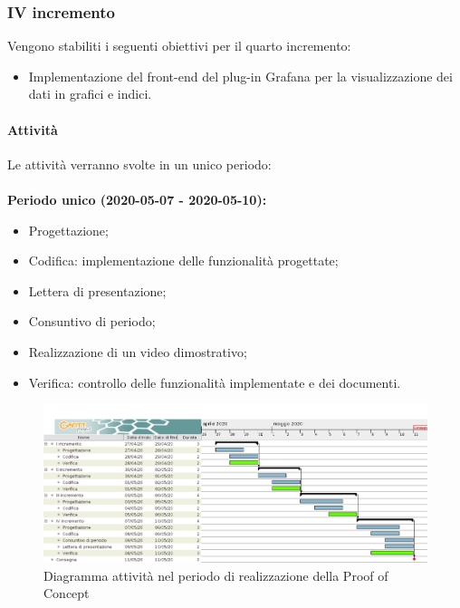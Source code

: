 \documentclass[../piano-di-progetto.tex]{subfiles}
\begin{document}
\subsubsection{IV incremento}

 Vengono stabiliti i seguenti obiettivi per il quarto incremento:
 \begin{itemize}
     \item Implementazione del front-end del plug-in Grafana per la visualizzazione dei dati in grafici e indici.
 \end{itemize}
\paragraph{Attività}
Le attività verranno svolte in un unico periodo:
\\
\\
\textbf{Periodo unico (2020-05-07 - 2020-05-10):}
\begin{itemize}
    \item Progettazione;
    \item Codifica: implementazione delle funzionalità progettate;
    \item Lettera di presentazione;
    \item Consuntivo di periodo;
    \item Realizzazione di un video dimostrativo;
    \item Verifica: controllo delle funzionalità implementate e dei documenti.
\end{itemize}



\newpage
\begin{landscape}
    \begin{figure}[H]
        \centering
        \includegraphics[width=24cm]{img/poc.png}
        \caption{Diagramma attività nel periodo di realizzazione della Proof of Concept}
      \end{figure}
\end{landscape}
\end{document}
